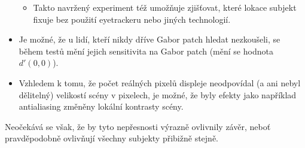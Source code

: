 \begin{itemize}
\begin{itemize}
\item Takto navržený experiment též umožňuje zjišťovat, které lokace subjekt
fixuje bez použití eyetrackeru nebo jiných technologií.

\end{itemize}

\item Je možné, že u lidí, kteří nikdy dříve Gabor patch hledat nezkoušeli, se
během testů mění jejich sensitivita na Gabor patch (mění se hodnota $d'(0,0)$).

\item Vzhledem k tomu, že počet reálných pixelů displeje neodpovídal (a ani
nebyl dělitelný) velikostí scény v pixelech, je možné, že byly efekty jako
například antialiasing změněny lokální kontrasty scény.

\end{itemize}

Neočekává se však, že by tyto nepřesnosti výrazně ovlivnily závěr, neboť
pravděpodobně ovlivňují všechny subjekty přibižně stejně.

